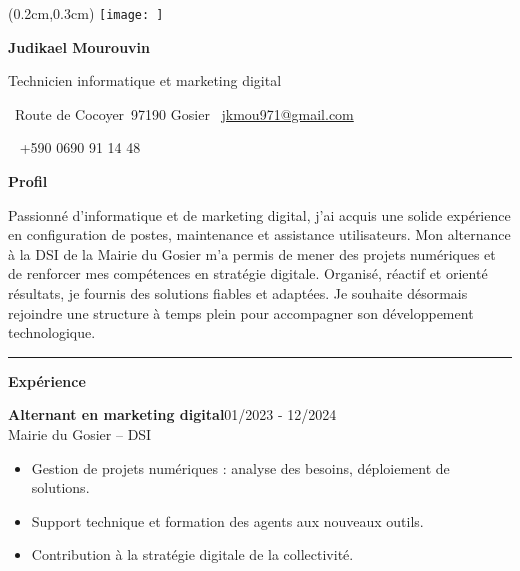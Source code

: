 \documentclass[a4paper]{article}
\renewcommand{\colorbox}[2]{#2}%
\newcommand{\fullrule}{\hspace{-1.5cm}\rule{\paperwidth}{0.4pt}}
\newcommand{\cvsection}[1]{%
  \vspace{6pt}\textbf{\Large #1}\par\vspace{2pt}}
\begin{document}
\color{white}
\ifx\relax\relax\else
\begin{textblock*}{4cm}(0.2cm,0.3cm)
  \texttt{[image: ]}
\end{textblock*}
 \fi
\begin{center}
  {\fontsize{44pt}{24pt}\selectfont\bfseries Judikael Mourouvin}

  \bigskip
  {\Large Technicien informatique et marketing digital}

  \bigskip\bigskip
  \faMapMarker~Route de Cocoyer\ 97190 Gosier
  \quad\faEnvelope~\href{mailto:jkmou971@gmail.com}{jkmou971@gmail.com}

  \bigskip
  \faPhone~ +590 0690 91 14 48
  \quad \faLinkedin\ \href{}{}
 

  \vspace{-0.3cm}
  
\end{center}
\cvsection{Profil}

Passionné d’informatique et de marketing digital, j’ai acquis une solide expérience en configuration de postes, maintenance et assistance utilisateurs. Mon alternance à la DSI de la Mairie du Gosier m’a permis de mener des projets numériques et de renforcer mes compétences en stratégie digitale. Organisé, réactif et orienté résultats, je fournis des solutions fiables et adaptées. Je souhaite désormais rejoindre une structure à temps plein pour accompagner son développement technologique.

\medskip\fullrule

\cvsection{Expérience}
\colorbox{maincolor}{%
  \begin{minipage}{\linewidth}
    \noindent
    \textbf{Alternant en marketing digital}\hfill 01/2023 - 12/2024\\
    Mairie du Gosier – DSI\\[-0.3em]
    \begin{itemize}[leftmargin=*]
      \item Gestion de projets numériques : analyse des besoins, déploiement de solutions. \item Support technique et formation des agents aux nouveaux outils. \item Contribution à la stratégie digitale de la collectivité.
    \end{itemize}
  \end{minipage}}
\end{document}

